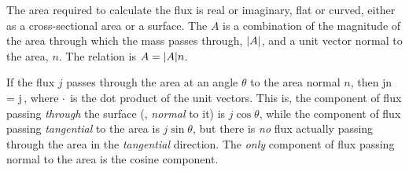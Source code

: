 The area required to calculate the flux is real or imaginary, flat or curved, either as a cross-sectional area or a surface. The  $A$ is a combination of the magnitude of the area through which the mass passes through, $\lvert{A}\rvert$, and a unit vector normal to the area, $n$. The relation is $A = \lvert{A}\rvert n$.

If the flux $j$ passes through the area at an angle $\theta$ to the area normal $n$, then
\beq
j\iprod n = j\cos\theta\,,
\eeq
where $\operatorname{\cdot}$ is the dot product of the unit vectors. This is, the component of flux passing \emph{through} the surface (\ie, \emph{normal} to it) is $j\cos\theta$, while the component of flux passing \emph{tangential} to the area is $j\sin\theta$, but there is \emph{no} flux actually passing through the area in the \emph{tangential} direction. The \emph{only} component of flux passing normal to the area is the cosine component.


